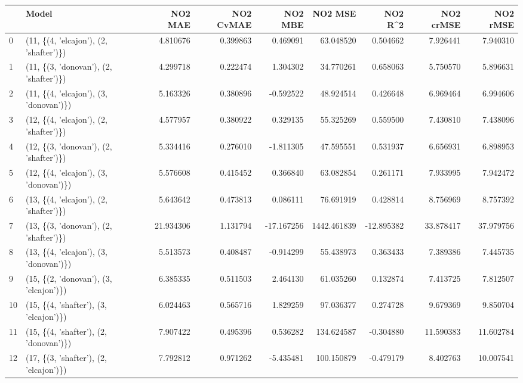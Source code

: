 \begin{tabular}{llrrrrrrr}
\toprule
{} &                                   Model &    NO2 MAE &  NO2 CvMAE &    NO2 MBE &      NO2 MSE &    NO2 R\textasciicircum2 &  NO2 crMSE &   NO2 rMSE \\
\midrule
0  &  (11, \{(4, 'elcajon'), (2, 'shafter')\}) &   4.810676 &   0.399863 &   0.469091 &    63.048520 &   0.504662 &   7.926441 &   7.940310 \\
1  &  (11, \{(3, 'donovan'), (2, 'shafter')\}) &   4.299718 &   0.222474 &   1.304302 &    34.770261 &   0.658063 &   5.750570 &   5.896631 \\
2  &  (11, \{(4, 'elcajon'), (3, 'donovan')\}) &   5.163326 &   0.380896 &  -0.592522 &    48.924514 &   0.426648 &   6.969464 &   6.994606 \\
3  &  (12, \{(4, 'elcajon'), (2, 'shafter')\}) &   4.577957 &   0.380922 &   0.329135 &    55.325269 &   0.559500 &   7.430810 &   7.438096 \\
4  &  (12, \{(3, 'donovan'), (2, 'shafter')\}) &   5.334416 &   0.276010 &  -1.811305 &    47.595551 &   0.531937 &   6.656931 &   6.898953 \\
5  &  (12, \{(4, 'elcajon'), (3, 'donovan')\}) &   5.576608 &   0.415452 &   0.366840 &    63.082854 &   0.261171 &   7.933995 &   7.942472 \\
6  &  (13, \{(4, 'elcajon'), (2, 'shafter')\}) &   5.643642 &   0.473813 &   0.086111 &    76.691919 &   0.428814 &   8.756969 &   8.757392 \\
7  &  (13, \{(3, 'donovan'), (2, 'shafter')\}) &  21.934306 &   1.131794 & -17.167256 &  1442.461839 & -12.895382 &  33.878417 &  37.979756 \\
8  &  (13, \{(4, 'elcajon'), (3, 'donovan')\}) &   5.513573 &   0.408487 &  -0.914299 &    55.438973 &   0.363433 &   7.389386 &   7.445735 \\
9  &  (15, \{(2, 'donovan'), (3, 'elcajon')\}) &   6.385335 &   0.511503 &   2.464130 &    61.035260 &   0.132874 &   7.413725 &   7.812507 \\
10 &  (15, \{(4, 'shafter'), (3, 'elcajon')\}) &   6.024463 &   0.565716 &   1.829259 &    97.036377 &   0.274728 &   9.679369 &   9.850704 \\
11 &  (15, \{(4, 'shafter'), (2, 'donovan')\}) &   7.907422 &   0.495396 &   0.536282 &   134.624587 &  -0.304880 &  11.590383 &  11.602784 \\
12 &  (17, \{(3, 'shafter'), (2, 'elcajon')\}) &   7.792812 &   0.971262 &  -5.435481 &   100.150879 &  -0.479179 &   8.402763 &  10.007541 \\

\end{tabular}
